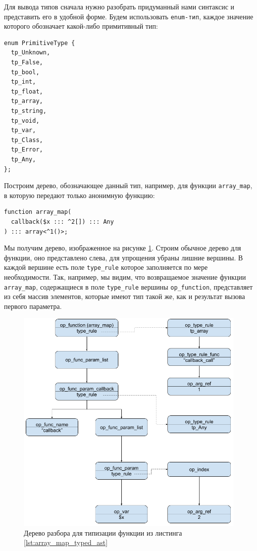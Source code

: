 Для вывода типов сначала нужно разобрать придуманный нами синтаксис и представить его в удобной форме.
Будем использовать \verb|enum-тип|, каждое значение которого обозначает какой-либо примитивный тип:
\begin{lstlisting}
enum PrimitiveType {
  tp_Unknown,
  tp_False,
  tp_bool,
  tp_int,
  tp_float,
  tp_array,
  tp_string,
  tp_void,
  tp_var,
  tp_Class,
  tp_Error,
  tp_Any,
};
\end{lstlisting}

Построим дерево, обозначающее данный тип, например, для функции \verb|array_map|, в которую передают только анонимную функцию:
\begin{lstlisting}[label={lst:array_map_typed_ast}]
function array_map(
  callback($x ::: ^2[]) ::: Any
) ::: array<^1()>;
\end{lstlisting}
Мы получим дерево, изображенное на рисунке \ref{fig:ast_for_callback}.
Строим обычное дерево для функции, оно представлено слева, для упрощения убраны лишние вершины.
В каждой вершине есть поле \verb|type_rule| которое заполняется по мере необходимости.
Так, например, мы видим, что возвращаемое значение функции \verb|array_map|, содержащиеся в поле \verb|type_rule| вершины \verb|op_function|, представляет из себя массив элементов, которые имеют тип такой же, как и результат вызова первого параметра.

\begin{figure}[H]
    \caption{Дерево разбора для типизации функции из листинга \ref{lst:array_map_typed_ast}}
    \label{fig:ast_for_callback}
    \centering
    \includegraphics[width=\linewidth]{images/ast_for_callback}
\end{figure}

